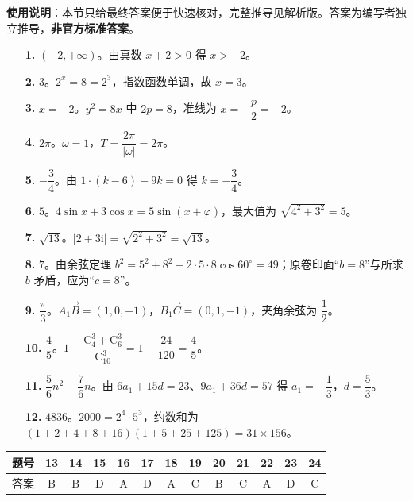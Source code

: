 
\begin{gknotice}
\textbf{使用说明}：本节只给最终答案便于快速核对，完整推导见解析版。答案为编写者独立推导，\textbf{非官方标准答案}。
\end{gknotice}

\begin{itemize}[leftmargin=2.6em]
  \item[\textbf{1.}] $(-2,+\infty)$。由真数 $x+2>0$ 得 $x>-2$。
  \item[\textbf{2.}] $3$。$2^x=8=2^3$，指数函数单调，故 $x=3$。
  \item[\textbf{3.}] $x=-2$。$y^2=8x$ 中 $2p=8$，准线为 $x=-\dfrac p2=-2$。
  \item[\textbf{4.}] $2\pi$。$\omega=1$，$T=\dfrac{2\pi}{|\omega|}=2\pi$。
  \item[\textbf{5.}] $-\dfrac34$。由 $1\cdot(k-6)-9k=0$ 得 $k=-\dfrac34$。
  \item[\textbf{6.}] $5$。$4\sin x+3\cos x=5\sin(x+\varphi)$，最大值为 $\sqrt{4^2+3^2}=5$。
  \item[\textbf{7.}] $\sqrt{13}$。$|2+3\mathrm i|=\sqrt{2^2+3^2}=\sqrt{13}$。
  \item[\textbf{8.}] $7$。由余弦定理 $b^2=5^2+8^2-2\cdot5\cdot8\cos60^\circ=49$；原卷印面“$b=8$”与所求 $b$ 矛盾，应为“$c=8$”。
  \item[\textbf{9.}] $\dfrac\pi3$。$\overrightarrow{A_1B}=(1,0,-1)$，$\overrightarrow{B_1C}=(0,1,-1)$，夹角余弦为 $\dfrac12$。
  \item[\textbf{10.}] $\dfrac45$。$1-\dfrac{\mathrm C_4^3+\mathrm C_6^3}{\mathrm C_{10}^3}=1-\dfrac{24}{120}=\dfrac45$。
  \item[\textbf{11.}] $\dfrac56n^2-\dfrac76n$。由 $6a_1+15d=23$、$9a_1+36d=57$ 得 $a_1=-\dfrac13$，$d=\dfrac53$。
  \item[\textbf{12.}] $4836$。$2000=2^4\cdot5^3$，约数和为 $(1+2+4+8+16)(1+5+25+125)=31\times156$。
\end{itemize}

\begin{center}\begin{tabular}{ccccccccccccc}
\toprule
题号 & 13 & 14 & 15 & 16 & 17 & 18 & 19 & 20 & 21 & 22 & 23 & 24 \\
\midrule
答案 & B & B & D & A & D & A & C & B & C & A & D & C \\
\bottomrule
\end{tabular}\end{center}

